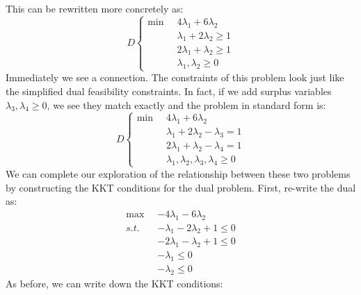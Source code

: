 This can be rewritten more concretely as:
\begin{displaymath}
D\left\{
\begin{aligned}
\min \;\; & 4\lambda_1 + 6\lambda_2\\
&\lambda_1 + 2\lambda_2 \geq 1\\
&2\lambda_1 + \lambda_2 \geq 1\\
& \lambda_1, \lambda_2 \geq 0
\end{aligned}
\right.
\end{displaymath}
Immediately we see a connection. The constraints of this problem look just like the simplified dual feasibility constraints. In fact, if we add surplus variables $\lambda_3, \lambda_4 \geq 0$, we see they match exactly and the problem in standard form is:
\begin{displaymath}
D\left\{
\begin{aligned}
\min \;\; & 4\lambda_1 + 6\lambda_2\\
&\lambda_1 + 2\lambda_2 - \lambda_3 = 1\\
&2\lambda_1 + \lambda_2 -\lambda_4 =1\\
& \lambda_1, \lambda_2,\lambda_3, \lambda_4 \geq 0
\end{aligned}
\right.
\end{displaymath}
We can complete our exploration of the relationship between these two problems by constructing the KKT conditions for the dual problem. First, re-write the dual as:
\begin{displaymath}
\begin{aligned}
\max\;\; & -4\lambda_1 - 6\lambda_2 \\
s.t. & -\lambda_1 - 2\lambda_2 + 1\leq 0\\
& -2\lambda_1 - \lambda_2 + 1\leq 0\\
& -\lambda_1 \leq 0\\
& -\lambda_2 \leq 0
\end{aligned}
\end{displaymath}
As before, we can write down the KKT conditions:
